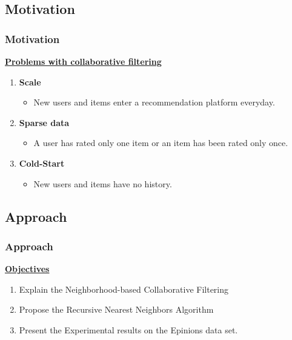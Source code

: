 \subsection{Motivation}
\begin{frame}[t]
    \frametitle{Motivation}
    \centering
    \underline{\textbf{Problems with collaborative filtering}}
    \vspace{0.5cm}
    \begin{enumerate}
        \item \textbf{Scale}
        \begin{itemize}
            \item New users and items enter a recommendation platform everyday.
        \end{itemize}
        \item \textbf{Sparse data}
        \begin{itemize}
            \item A user has rated only one item or an item has been rated only once.
        \end{itemize}
        \item \textbf{Cold-Start}
        \begin{itemize}
            \item New users and items have no history.
        \end{itemize}
   \end{enumerate}
\end{frame}
\subsection{Approach}
\begin{frame}[t]
    \frametitle{Approach}
    \centering
    \underline{\textbf{Objectives}}
    \vspace{1cm}
    \begin{enumerate}
        \item Explain the Neighborhood-based Collaborative Filtering
        \item Propose the Recursive Nearest Neighbors Algorithm
        \item Present the Experimental results on the Epinions data set.
    \end{enumerate}
\end{frame}
